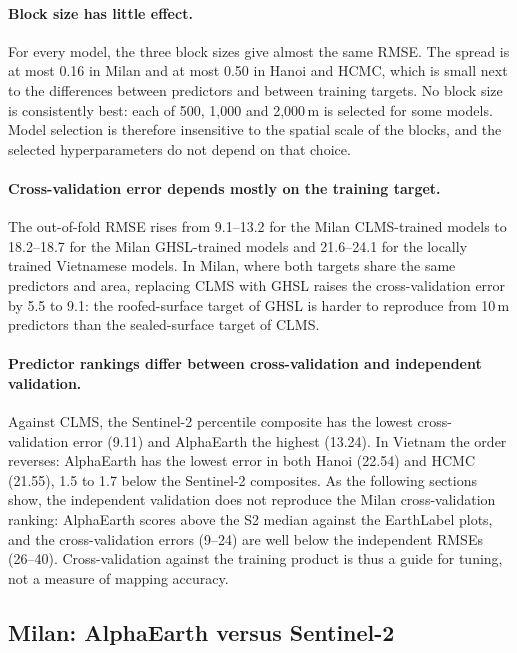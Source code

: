 \paragraph{Block size has little effect.} For every model, the three block
sizes give almost the same RMSE. The spread is at most 0.16\pp{} in Milan and
at most 0.50\pp{} in Hanoi and HCMC, which is small next to the differences
between predictors and between training targets. No block size is
consistently best: each of 500, 1{,}000 and 2{,}000\,m is selected for some
models. Model selection is therefore insensitive to the spatial scale of the
blocks, and the selected hyperparameters do not depend on that choice.

\paragraph{Cross-validation error depends mostly on the training target.}
The out-of-fold RMSE rises from 9.1--13.2\pp{} for the Milan CLMS-trained
models to 18.2--18.7\pp{} for the Milan GHSL-trained models and
21.6--24.1\pp{} for the locally trained Vietnamese models. In Milan, where
both targets share the same predictors and area, replacing CLMS with GHSL
raises the cross-validation error by 5.5 to 9.1\pp{}: the roofed-surface
target of GHSL is harder to reproduce from 10\,m predictors than the
sealed-surface target of CLMS.

\paragraph{Predictor rankings differ between cross-validation and
independent validation.} Against CLMS, the Sentinel-2 percentile composite
has the lowest cross-validation error (9.11\pp) and AlphaEarth the highest
(13.24\pp). In Vietnam the order reverses: AlphaEarth has the lowest error in
both Hanoi (22.54\pp) and HCMC (21.55\pp), 1.5 to 1.7\pp{} below the
Sentinel-2 composites. As the following sections show, the independent
validation does not reproduce the Milan cross-validation ranking: AlphaEarth
scores above the S2 median against the EarthLabel plots, and the
cross-validation errors (9--24\pp) are well below the independent RMSEs
(26--40\pp). Cross-validation against the training product is thus a guide
for tuning, not a measure of mapping accuracy.

\subsection{Milan: AlphaEarth versus Sentinel-2}
\label{sec:res-milan}

